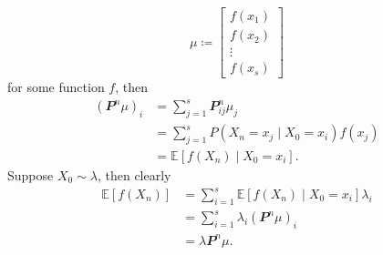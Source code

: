 \documentclass[math, code]{amznotes}
\theoremstyle{remark}
\begin{document}
\begin{equation*}
    \mu \coloneqq \begin{bmatrix}
        f\left(x_1\right) \\
        f\left(x_2\right) \\
        \vdots \\
        f\left(x_s\right)
    \end{bmatrix}
\end{equation*}
for some function $f$, then 
\begin{align*}
    \left(\mathbfit{P}^n\mu\right)_i & = \sum_{j = 1}^{s}\mathbfit{P}^n_{ij}\mu_j \\
    & = \sum_{j = 1}^{s}P\left(X_n = x_j \mid X_0 = x_i\right)f\left(x_j\right) \\
    & = \mathbb{E}\left[f\left(X_n\right) \mid X_0 = x_i\right].
\end{align*}
Suppose $X_0 \sim \lambda$, then clearly 
\begin{align*}
    \mathbb{E}\left[f\left(X_n\right)\right] & = \sum_{i = 1}^{s}\mathbb{E}\left[f\left(X_n\right) \mid X_0 = x_i\right]\lambda_i \\
    & = \sum_{i = 1}^{s}\lambda_i\left(\mathbfit{P}^n\mu\right)_i \\
    & = \lambda\mathbfit{P}^n\mu.
\end{align*}
\end{document}
